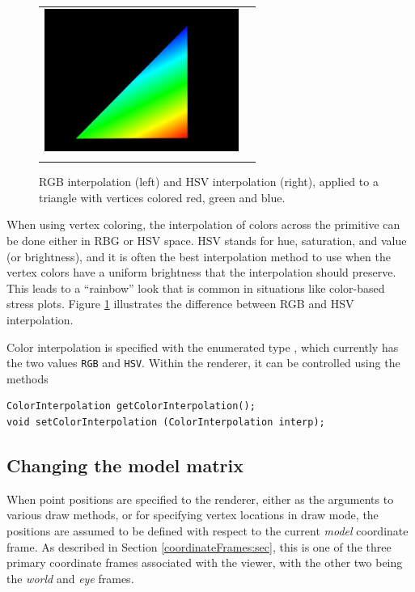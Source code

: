 \begin{figure}[ht]
\begin{center}
\begin{tabular}{cc}
         \includegraphics[width=2.5in]{images/HSVinterpolation}\\
      \fi
   \end{tabular}
\end{center}
\caption{RGB interpolation (left) and HSV interpolation (right),
applied to a triangle with vertices colored red,
green and blue.}
\label{RGBvsHSV:fig}
\end{figure}

When using vertex coloring, the interpolation of colors across the
primitive can be done either in RBG or HSV space. HSV stands for hue,
saturation, and value (or brightness), and it is often the best
interpolation method to use when the vertex colors have a uniform
brightness that the interpolation should preserve. This leads to a
``rainbow'' look that is common in situations like color-based stress
plots. Figure \ref{RGBvsHSV:fig} illustrates the difference between
RGB and HSV interpolation.

Color interpolation is specified with the enumerated type
, which
currently has the two values {\tt RGB} and {\tt HSV}. Within the
renderer, it can be controlled using the methods
%
\begin{lstlisting}[]
ColorInterpolation getColorInterpolation();
void setColorInterpolation (ColorInterpolation interp);
\end{lstlisting}
%

\subsection{Changing the model matrix}
\label{modelMatrix:sec}

When point positions are specified to the renderer, either as the
arguments to various draw methods, or for specifying vertex
locations in draw mode, the positions are assumed to be defined with
respect to the current {\it model} coordinate frame. As described in
Section \ref{coordinateFrames:sec}, this is one of the three primary
coordinate frames associated with the viewer, with the other two
being the {\it world} and {\it eye} frames.

